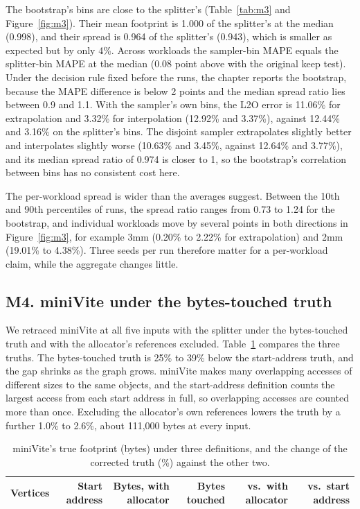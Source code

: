 \documentclass[11pt]{article}
\newcommand{\tabinput}[1]{}
\begin{document}
The bootstrap's bins are close to the splitter's (Table~\ref{tab:m3} and Figure~\ref{fig:m3}). Their mean
footprint is 1.000 of the splitter's at the median (0.998), and their spread is 0.964 of the splitter's (0.943),
which is smaller as expected but by only 4\%. Across workloads the sampler-bin MAPE equals the splitter-bin MAPE at the
median (0.08 point above with the original keep test). Under the decision rule fixed before the runs, the chapter
reports the bootstrap, because the MAPE difference is below 2 points and the median spread ratio lies between 0.9 and
1.1. With the sampler's own bins, the L2O error is 11.06\% for extrapolation and 3.32\% for interpolation (12.92\%
and 3.37\%), against 12.44\% and 3.16\% on the splitter's bins. The disjoint sampler extrapolates slightly better
and interpolates slightly worse (10.63\% and 3.45\%, against 12.64\% and 3.77\%), and its median spread ratio of
0.974 is closer to 1, so the bootstrap's correlation between bins has no consistent cost here.

The per-workload spread is wider than the averages suggest. Between the 10th and 90th percentiles of runs, the
spread ratio ranges from 0.73 to 1.24 for the bootstrap, and individual workloads move by several points in both
directions in Figure~\ref{fig:m3}, for example 3mm (0.20\% to 2.22\% for extrapolation) and 2mm (19.01\% to
4.38\%). Three seeds per run therefore matter for a per-workload claim, while the aggregate changes little.

\subsection{M4. miniVite under the bytes-touched truth}
\label{sec:m4}

We retraced miniVite at all five inputs with the splitter under the bytes-touched truth and with the allocator's
references excluded. Table~\ref{tab:m4truth} compares the three truths. The bytes-touched truth is 25\% to 39\%
below the start-address truth, and the gap shrinks as the graph grows. miniVite makes many overlapping accesses
of different sizes to the same objects, and the start-address definition counts the largest access from each
start address in full, so overlapping accesses are counted more than once. Excluding the allocator's own
references lowers the truth by a further 1.0\% to 2.6\%, about 111,000 bytes at every input.

\begin{table}[htbp]
\centering
\caption{miniVite's true footprint (bytes) under three definitions, and the change of the corrected truth (\%)
against the other two.}
\label{tab:m4truth}
\small
\begin{tabular}{@{}rrrrrr@{}}
\toprule
Vertices & Start address & Bytes, with allocator & Bytes touched & vs.\ with allocator & vs.\ start address \\
\midrule
\tabinput{m4_truth}
\bottomrule
\end{tabular}
\end{table}
\end{document}
